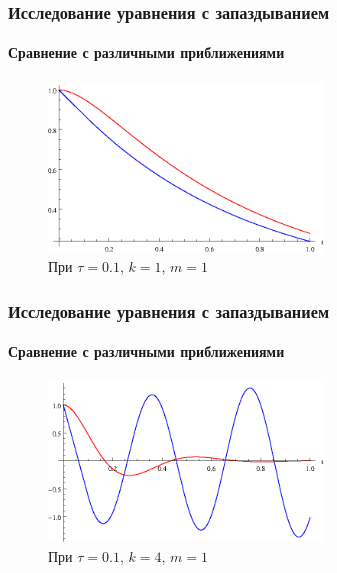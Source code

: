 \documentclass{beamer}
\numberwithin{equation}{section}
\begin{document}
    \begin{frame}
        \frametitle{Исследование уравнения с запаздыванием}
        \framesubtitle{Сравнение с различными приближениями}

        \begin{figure}[h]
        \begin{center}
            \includegraphics[width=0.65\textwidth]{example_trivia.eps}
        \end{center}
        \caption{При $\tau=0.1$, $k=1$, $m=1$}
        \end{figure}
    \end{frame}

    \begin{frame}
        \frametitle{Исследование уравнения с запаздыванием}
        \framesubtitle{Сравнение с различными приближениями}

        \begin{figure}[h]
        \begin{center}
            \includegraphics[width=0.65\textwidth]{example_trivia_bad.eps}
        \end{center}
        \caption{При $\tau=0.1$, $k=4$, $m=1$}
        \end{figure}
    \end{frame}
\end{document}

